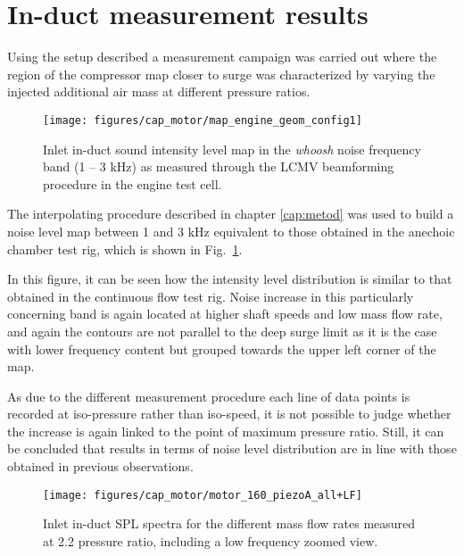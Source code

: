 \section{In-duct measurement results}

Using the setup described a measurement campaign was carried out where the region of the compressor map closer to surge was characterized by varying the injected additional air mass at different pressure ratios.

\begin{figure}[b!]
\centering
\vspace{-5mm}
\texttt{[image: figures/cap\_motor/map\_engine\_geom\_config1]}
\vspace{-5mm}
\caption[In-duct SIL map in the 1 -- 3 kHz band]{Inlet in-duct sound intensity level map in the \emph{whoosh} noise frequency band (1 -- 3 kHz) as measured through the LCMV beamforming procedure in the engine test cell.}
\label{fig:mot_map_engine_geom_config1}
\end{figure}

The interpolating procedure described in chapter \ref{cap:metod} was used to build a noise level map between 1 and 3 kHz equivalent to those obtained in the anechoic chamber test rig, which is shown in Fig.~\ref{fig:mot_map_engine_geom_config1}.

In this figure, it can be seen how the intensity level distribution is similar to that obtained in the continuous flow test rig. Noise increase in this particularly concerning band is again located at higher shaft speeds and low mass flow rate, and again the contours are not parallel to the deep surge limit as it is the case with lower frequency content but grouped towards the upper left corner of the map.

As due to the different measurement procedure each line of data points is recorded at iso-pressure rather than iso-speed, it is not possible to judge whether the increase is again linked to the point of maximum pressure ratio. Still, it can be concluded that results in terms of noise level distribution are in line with those obtained in previous observations.

\begin{figure}[htb!]
\centering
\texttt{[image: figures/cap\_motor/motor\_160\_piezoA\_all+LF]}
\caption[In-duct SPL for different mass flow rates]{Inlet in-duct SPL spectra for the different mass flow rates measured at 2.2 pressure ratio, including a low frequency zoomed view.}
\label{fig:motor_160_piezoA_all+LF}
\end{figure}

